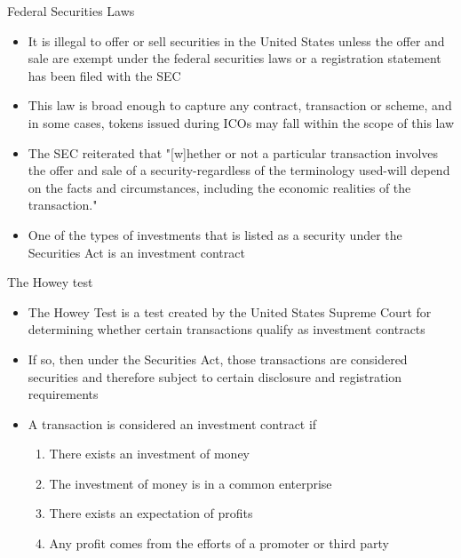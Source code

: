 \documentclass[9pt]{beamer}
\begin{document}

\begin{frame}{Federal Securities Laws}
	\begin{itemize}
		\item It is illegal to offer or sell securities in the United States unless the offer and sale are exempt under the federal securities laws or a registration statement has been filed with the SEC
		\item This law is broad enough to capture any contract, transaction or scheme, and in some cases, tokens issued during ICOs may fall within the scope of this law
		\item The SEC reiterated that "[w]hether or not a particular transaction involves the offer and sale of a security-regardless of the terminology used-will depend on the facts and circumstances, including the economic realities of the transaction."
		\item One of the types of investments that is listed as a security under the Securities Act is an investment contract
	\end{itemize}
\end{frame}


\begin{frame}{The Howey test}
	\begin{itemize}
		\item The Howey Test is a test created by the United States Supreme Court for determining whether certain transactions qualify as investment contracts
		\item If so, then under the Securities Act, those transactions are considered securities and therefore subject to certain disclosure and registration requirements
		\item A transaction is considered an investment contract if
		\begin{enumerate}
			\item There exists an investment of money
			\item The investment of money is in a common enterprise
			\item There exists an expectation of profits
			\item Any profit comes from the efforts of a promoter or third party
		\end{enumerate}
	\end{itemize}
\end{frame}
\end{document}
